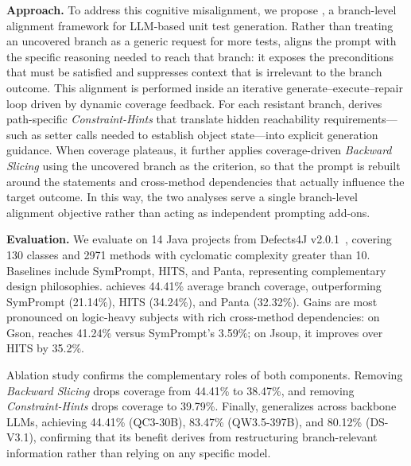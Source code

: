 \textbf{Approach.}
To address this cognitive misalignment, we propose \ourmethod{}, a branch-level alignment framework for LLM-based unit test generation. Rather than treating an uncovered branch as a generic request for more tests, \ourmethod{} aligns the prompt with the specific reasoning needed to reach that branch: it exposes the preconditions that must be satisfied and suppresses context that is irrelevant to the branch outcome.
This alignment is performed inside an iterative generate--execute--repair loop driven by dynamic coverage feedback. For each resistant branch, \ourmethod{} derives path-specific \textit{Constraint-Hints} that translate hidden reachability requirements---such as setter calls needed to establish object state---into explicit generation guidance. When coverage plateaus, it further applies coverage-driven \textit{Backward Slicing} using the uncovered branch as the criterion, so that the prompt is rebuilt around the statements and cross-method dependencies that actually influence the target outcome. In this way, the two analyses serve a single branch-level alignment objective rather than acting as independent prompting add-ons.

\textbf{Evaluation.}
We evaluate \ourmethod{} on 14 Java projects from Defects4J v2.0.1~\cite{defects4j2014}, covering 130 classes and 2971 methods with cyclomatic complexity greater than 10. Baselines include SymPrompt, HITS, and Panta, representing complementary design philosophies.
\ourmethod{} achieves 44.41\% average branch coverage, outperforming SymPrompt (21.14\%), HITS (34.24\%), and Panta (32.32\%). 
Gains are most pronounced on logic-heavy subjects with rich cross-method dependencies: on Gson, \ourmethod{} reaches 41.24\% versus SymPrompt's 3.59\%; on Jsoup, it improves over HITS by 35.2\%.

Ablation study confirms the complementary roles of both components. 
Removing \emph{Backward Slicing} drops coverage from 44.41\% to 38.47\%, and removing \emph{Constraint-Hints} drops coverage to 39.79\%.
Finally, \ourmethod{} generalizes across backbone LLMs, achieving 44.41\% (QC3-30B), 83.47\% (QW3.5-397B), and 80.12\% (DS-V3.1), confirming that its benefit derives from restructuring branch-relevant information rather than relying on any specific model.

